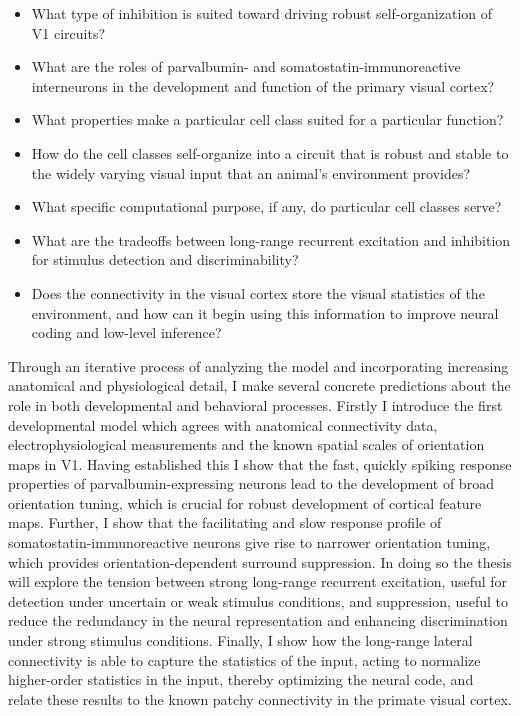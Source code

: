 \begin{itemize}
\item What type of inhibition is suited toward driving robust
  self-organization of V1 circuits?
\item What are the roles of parvalbumin- and somatostatin-immunoreactive
  interneurons in the development and function of the primary visual
  cortex?
\item What properties make a particular cell class suited for a
  particular function?
\item How do the cell classes self-organize into a circuit that is
  robust and stable to the widely varying visual input that an
  animal's environment provides?
\item What specific computational purpose, if any, do particular cell
  classes serve?
\item What are the tradeoffs between long-range recurrent excitation
  and inhibition for stimulus detection and discriminability?
\item Does the connectivity in the visual cortex store the visual
  statistics of the environment, and how can it begin using this
  information to improve neural coding and low-level inference?
\end{itemize}

Through an iterative process of analyzing the model and incorporating
increasing anatomical and physiological detail, I make
several concrete predictions about the role in both developmental and
behavioral processes. Firstly I introduce the first developmental model
which agrees with anatomical connectivity data, electrophysiological
measurements and the known spatial scales of orientation maps in V1.
Having established this I show that the fast, quickly spiking response
properties of parvalbumin-expressing neurons lead to the development
of broad orientation tuning, which is crucial for robust development
of cortical feature maps. Further, I show that the facilitating and
slow response profile of somatostatin-immunoreactive neurons give rise
to narrower orientation tuning, which provides orientation-dependent
surround suppression. In doing so the thesis will explore the tension
between strong long-range recurrent excitation, useful for detection
under uncertain or weak stimulus conditions, and suppression, useful to
reduce the redundancy in the neural representation and enhancing
discrimination under strong stimulus conditions. Finally, I show how
the long-range lateral connectivity is able to capture the statistics
of the input, acting to normalize higher-order statistics in the
input, thereby optimizing the neural code, and relate these results to
the known patchy connectivity in the primate visual cortex.

